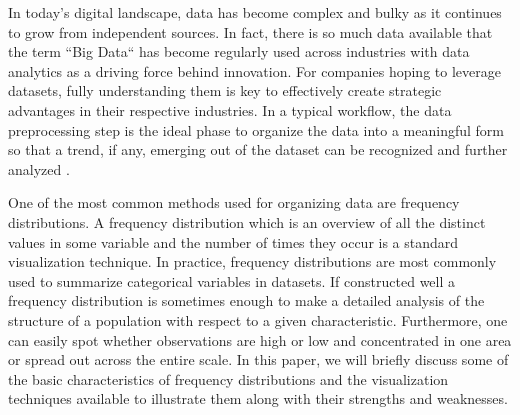 In today's digital landscape, data has become complex and bulky as it continues to 
grow from independent sources. In fact, there is so much data available that the 
term ``Big Data`` has become regularly used across industries with data analytics as a 
driving force behind innovation. For companies hoping to leverage datasets, fully
understanding them is key to effectively create strategic advantages in their respective 
industries. In a typical workflow, the data preprocessing step is the ideal phase 
to organize the data into a meaningful form so that a trend, if any, emerging 
out of the dataset can be recognized and further analyzed \cite{c10}. 

One of the most common methods used for organizing data are frequency distributions.
A frequency distribution which is an overview of all the distinct values in some 
variable and the number of times they occur is a standard visualization technique. 
In practice, frequency distributions are most commonly used to summarize categorical 
variables in datasets. If constructed well a frequency distribution is sometimes 
enough to make a detailed analysis of the structure of a population with respect 
to a given characteristic. Furthermore, one can easily spot whether observations 
are high or low and concentrated in one area or spread out across the entire scale. 
In this paper, we will briefly discuss some of the basic characteristics of 
frequency distributions and the visualization techniques available to 
illustrate them along with their strengths and weaknesses.
